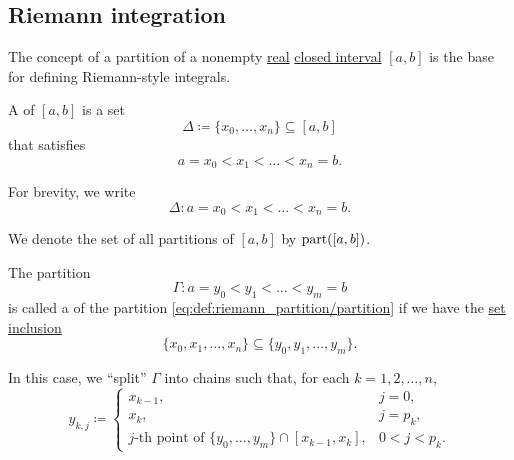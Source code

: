 \subsection{Riemann integration}\label{subsec:riemann_integration}

\begin{definition}\label{def:riemann_partition}
  The concept of a partition of a nonempty \hyperref[def:set_of_real_numbers]{real} \hyperref[def:partially_ordered_set_interval/closed]{closed interval} \( [a, b] \) is the base for defining Riemann-style integrals.

  \begin{thmenum}
     A  of \( [a, b] \) is a set
    \begin{equation*}
      \Delta \coloneqq \{ x_0, \ldots, x_n \} \subseteq [a, b]
    \end{equation*}
    that satisfies
    \begin{equation*}
      a = x_0 < x_1 < \ldots < x_n = b.
    \end{equation*}

    For brevity, we write
    \begin{equation}\label{eq:def:riemann_partition/partition}
      \Delta: a = x_0 < x_1 < \ldots < x_n = b.
    \end{equation}

    We denote the set of all partitions of \( [a, b] \) by \( \operatorname{part}([a, b]) \).

     The partition
    \begin{equation*}
      \Gamma: a = y_0 < y_1 < \ldots < y_m = b
    \end{equation*}
    is called a  of the partition \eqref{eq:def:riemann_partition/partition} if we have the \hyperref[def:subset]{set inclusion}
    \begin{equation}\label{eq:def:riemann_partition/refinement/inclusion}
      \{ x_0, x_1, \ldots, x_n \} \subseteq \{ y_0, y_1, \ldots, y_m \}.
    \end{equation}

    In this case, we \enquote{split} \( \Gamma \) into chains such that, for each \( k = 1, 2, \ldots, n \),
    \begin{equation}\label{def:riemann_partition/refinement/splitting}
      y_{k,j} \coloneqq \begin{cases}
        x_{k-1},                                                                          &j = 0, \\
        x_k,                                                                              &j = p_k, \\
        j\text{-th point of } \{ y_0, \ldots, y_m \} \cap [x_{k-1}, x_k], &0 < j < p_k.
      \end{cases}
    \end{equation}


\end{thmenum}
\end{definition}
